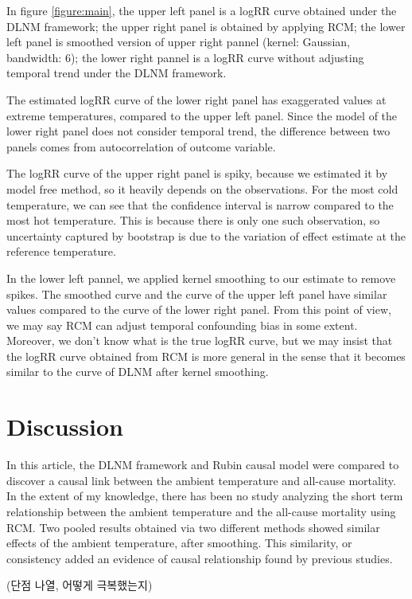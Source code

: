 \documentclass[12pt]{article}
\begin{document}
In figure \ref{figure:main},
the upper left panel is a logRR curve obtained under the DLNM framework;
the upper right panel is obtained by applying RCM;
the lower left panel is smoothed version of upper right pannel (kernel: Gaussian, bandwidth: $6$);
the lower right pannel is a logRR curve without adjusting temporal trend under the DLNM framework.

The estimated logRR curve of the lower right panel has exaggerated values at extreme temperatures,
compared to the upper left panel.
Since the model of the lower right panel does not consider temporal trend,
the difference between two panels comes from autocorrelation of outcome variable.

The logRR curve of the upper right panel is spiky,
because we estimated it by model free method, so it heavily depends on the observations.
For the most cold temperature, 
we can see that the confidence interval is narrow compared to the most hot temperature.
This is because there is only one such observation,
so uncertainty captured by bootstrap is due to the variation of effect estimate at the reference temperature.

In the lower left pannel, we applied kernel smoothing to our estimate to remove spikes.
The smoothed curve and the curve of the upper left panel have similar values 
compared to the curve of the lower right panel.
From this point of view, 
we may say RCM can adjust temporal confounding bias in some extent.
Moreover, we don't know what is the true logRR curve,
but we may insist that the logRR curve obtained from RCM is more general
in the sense that it becomes similar to the curve of DLNM after kernel smoothing.


\section{Discussion}
\label{section:discussion}

In this article,
the DLNM framework and Rubin causal model were compared
to discover a causal link between the ambient temperature and all-cause mortality.
In the extent of my knowledge, there has been no study analyzing the short term relationship 
between the ambient temperature and the all-cause mortality using RCM.
Two pooled results obtained via two different methods
showed similar effects of the ambient temperature, after smoothing.
This similarity, or consistency
added an evidence of causal relationship found by previous studies.

(단점 나열, 어떻게 극복했는지)
\end{document}
